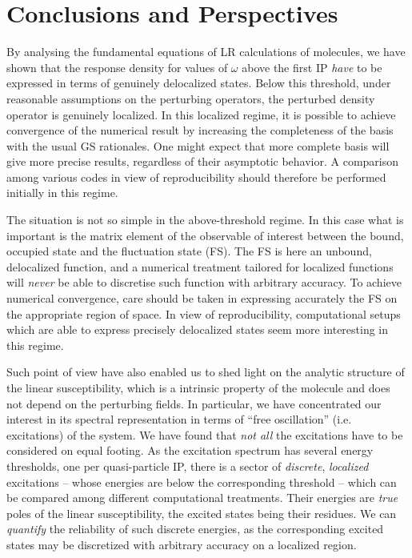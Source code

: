 \documentclass[reprint,aps,prb]{revtex4-1}
\begin{document}
\section{Conclusions and Perspectives}

By analysing the fundamental equations of LR calculations of molecules, we have shown that the response density for values of $\omega$ above the first IP
\emph{have} to be expressed in terms of genuinely delocalized states. 
Below this threshold,
under reasonable assumptions on the perturbing operators,
the perturbed density operator is genuinely localized.
In this localized regime, it is possible to achieve convergence of the numerical result
by increasing the completeness of the basis with the usual GS rationales.
One might expect that more complete basis will give more precise results, regardless of their asymptotic behavior.
A comparison among various codes in view of reproducibility should therefore be performed 
initially in this regime.

The situation is not so simple in the above-threshold regime.
In this case what is important is the matrix element of the observable of interest
between the bound, occupied state and the fluctuation state (FS). 
The FS is here an unbound, delocalized function, and a numerical treatment tailored for localized functions will \emph{never} be able to discretise such function with arbitrary accuracy.  
To achieve numerical convergence, care should be taken in expressing accurately the FS on the
appropriate region of space. In view of reproducibility, computational setups which are able to express precisely
delocalized states seem more interesting in this regime.

Such point of view have also enabled us to shed light on the analytic structure of the 
linear susceptibility, which is a intrinsic property of the molecule and does not depend on
 the perturbing fields.
 In particular, we have concentrated our interest in its spectral representation in
 terms of ``free oscillation'' (i.e. excitations) of the system.
 We have found that \emph{not all} the excitations have to be considered on equal footing.
 As the excitation spectrum has several energy thresholds, one per quasi-particle IP,
 there is a sector of \emph{discrete}, \emph{localized} excitations -- whose energies are 
below the corresponding threshold -- which can be compared among different computational treatments.
Their energies are \emph{true} poles of the linear susceptibility, the excited states being their residues. We can \emph{quantify} the reliability of such discrete energies, as the corresponding excited states may be discretized with arbitrary accuracy on a localized region.
\end{document}

